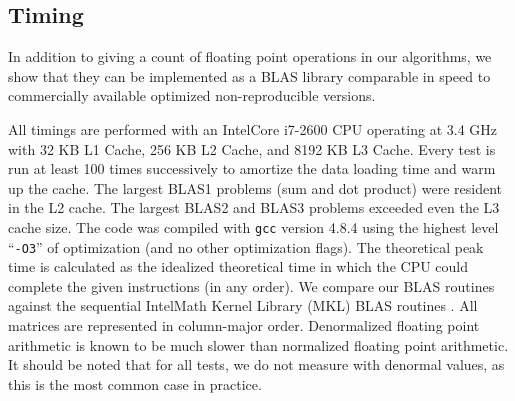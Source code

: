 \subsection{Timing}
  In addition to giving a count of floating point operations in our algorithms, we show that they can be implemented as a BLAS library comparable in speed to commercially available optimized non-reproducible versions.

  All timings are performed with an Intel\textregistered Core i7-2600 CPU operating at 3.4 GHz with 32 KB L1 Cache, 256 KB L2 Cache, and 8192 KB L3 Cache. Every test is run at least 100 times successively to amortize the data loading time and warm up the cache. The largest BLAS1 problems (sum and dot product) were resident in the L2 cache. The largest BLAS2 and BLAS3 problems exceeded even the L3 cache size. The code was compiled with \texttt{gcc} version 4.8.4 using the highest level ``\texttt{-O3}'' of optimization (and no other optimization flags). The theoretical peak time is calculated as the idealized theoretical time in which the CPU could complete the given instructions (in any order). We compare our BLAS routines against the sequential Intel\textregistered Math Kernel Library (MKL) BLAS routines \cite{MKL}. All matrices are represented in column-major order. Denormalized floating point arithmetic is known to be much slower than normalized floating point arithmetic. It should be noted that for all tests, we do not measure with denormal values, as this is the most common case in practice.

